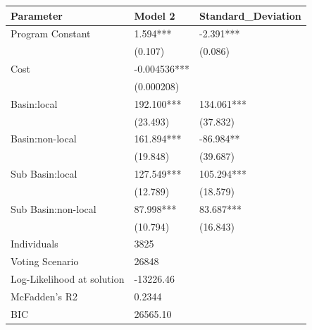 \begin{table}[ht]
\centering
\begin{tabular}{lll}
  \hline
Parameter & Model 2 & Standard\_Deviation \\ 
  \hline
Program Constant & 1.594*** & -2.391*** \\ 
   & (0.107) & (0.086) \\ 
  Cost & -0.004536*** &  \\ 
   & (0.000208) &  \\ 
  Basin:local & 192.100*** & 134.061*** \\ 
   & (23.493) & (37.832) \\ 
  Basin:non-local & 161.894*** & -86.984** \\ 
   & (19.848) & (39.687) \\ 
  Sub Basin:local & 127.549*** & 105.294*** \\ 
   & (12.789) & (18.579) \\ 
  Sub Basin:non-local & 87.998*** & 83.687*** \\ 
   & (10.794) & (16.843) \\ 
  Individuals & 3825 &  \\ 
  Voting Scenario & 26848 &  \\ 
  Log-Likelihood at solution & -13226.46 &  \\ 
  McFadden’s R2 & 0.2344 &  \\ 
  BIC & 26565.10 &  \\ 
   \hline
\end{tabular}
\end{table}
